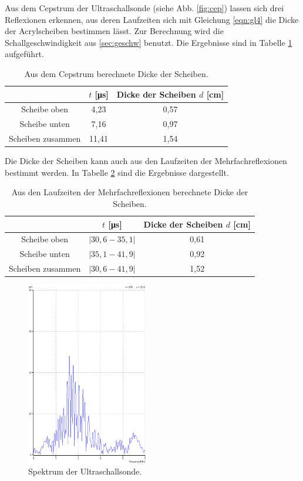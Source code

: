 Aus dem Cepstrum der Ultraschallsonde (siehe Abb. \ref{fig:cep}) lassen sich drei Reflexionen erkennen, aus deren Laufzeiten sich mit Gleichung \eqref{eqn:gl4} die Dicke der Acrylscheiben bestimmen lässt.
Zur Berechnung wird die Schallgeschwindigkeit aus \ref{sec:geschw} benutzt.
Die Ergebnisse sind in Tabelle \ref{tab:cep} aufgeführt.
\begin{table}
  \centering
  \caption{Aus dem Cepstrum berechnete Dicke der Scheiben.}
  \label{tab:cep}
  \begin{tabular}{c c c}
    \toprule
    & $t$ [\si{\micro\second}] & Dicke der Scheiben $d$ [\si{\centi\meter}] \\
    \midrule
    Scheibe oben & 4,23 & 0,57\\
    Scheibe unten & 7,16 & 0,97\\
    Scheiben zusammen & 11,41 & 1,54 \\
    \bottomrule
  \end{tabular}
\end{table}
Die Dicke der Scheiben kann auch aus den Laufzeiten der Mehrfachreflexionen bestimmt werden.
In Tabelle \ref{tab:mehr} sind die Ergebnisse dargestellt.
\begin{table}
  \centering
  \caption{Aus den Laufzeiten der Mehrfachreflexionen berechnete Dicke der Scheiben.}
  \label{tab:mehr}
  \begin{tabular}{c c c}
    \toprule
    & $t$ [\si{\micro\second}] & Dicke der Scheiben $d$ [\si{\centi\meter}] \\
    \midrule
    Scheibe oben & $|30,6-35,1|$ & 0,61\\
    Scheibe unten & $|35,1-41,9|$ & 0,92\\
    Scheiben zusammen & $|30,6-41,9|$ & 1,52 \\
    \bottomrule
  \end{tabular}
\end{table}
\begin{figure}
  \centering
  \includegraphics[height=8cm]{data/FFT.png}
  \caption{Spektrum der Ultraschallsonde.}
  \label{fig:FFT}
\end{figure}

